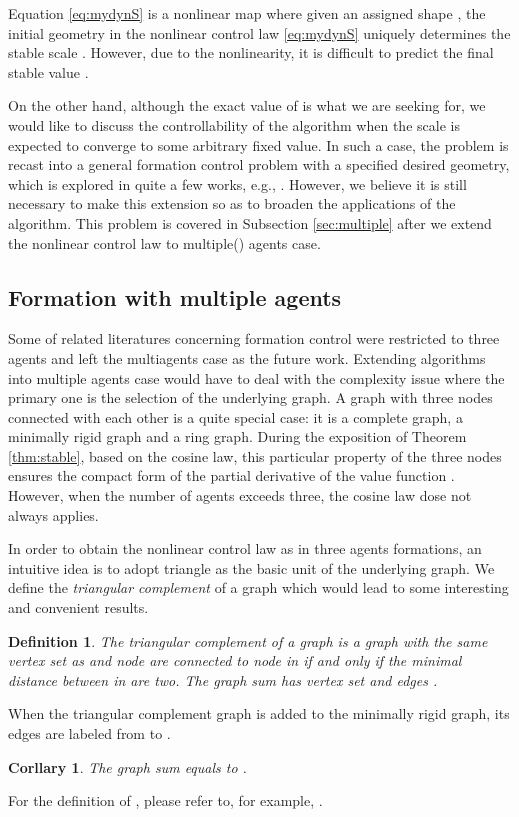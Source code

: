\documentclass[times]{rncauth}
\newtheorem{cor}{Corllary}[section]
\newtheorem{defn}{Definition}[section]
\begin{document}
Equation \eqref{eq:mydynS} is a nonlinear map  where given an
assigned shape , the
 initial geometry   in the nonlinear control law
\eqref{eq:mydynS} uniquely determines the stable scale
.  However, due to the nonlinearity,  it is difficult
to predict the final stable value .


On the other hand, although the exact value of  is
what we are seeking for, we would like to discuss the
controllability of the algorithm when the scale is expected to
converge to some arbitrary fixed value. In such a case, the problem
is recast into a general formation control problem with a specified
desired geometry, which is explored in quite a few works, e.g.,
\cite{Belta04optimal}. However, we believe it is still necessary to
make this extension so as to broaden the applications of the
algorithm. This problem is covered in Subsection \ref{sec:multiple}
after we extend the nonlinear control law to multiple() agents
case.

\subsection{Formation with multiple agents}
Some of related literatures concerning formation control were
restricted to three agents\cite{Basiri10angleonly,Bhatt09geometric}
and left the multiagents case as the future work. Extending
algorithms into multiple agents case would have to deal with the
complexity issue where the primary one is the selection of the
underlying graph. A graph with three nodes connected with each other
is a quite special case: it is a complete graph, a minimally rigid
graph and a ring graph. During the exposition of Theorem
\ref{thm:stable}, based on the cosine law, this particular property
of the three nodes ensures the compact form of the partial
derivative of the value function . However, when the number of
agents exceeds three, the cosine law dose not always applies.


In order to obtain the nonlinear control law as in three agents
formations, an intuitive idea is to  adopt triangle as the basic
unit of the underlying graph. We define the \emph{triangular
complement} of a graph which would lead to some interesting and
convenient results.
\begin{defn}
  The \emph{triangular complement} of a graph  is a graph 
  with the same
  vertex set as  and node  are connected to node  in  if and only if
  the minimal distance between  in  are two.
   The graph sum 
  has vertex set  and edges .
\end{defn}
\begin{rm}
  When the triangular complement graph is added to the minimally rigid
graph, its edges are labeled from  to .
\end{rm}
\begin{cor}
  The graph sum  equals to
  .
\end{cor}
For the definition of , please refer to, for example,
\cite{Diestel10,Anderson09easilyLocalizable}.
\end{document}
